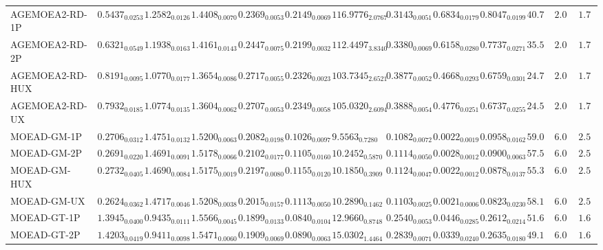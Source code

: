 \documentclass[11pt,a4paper]{article}
\begin{document}
\begin{table}[H]
{\begin{tabular}{lcccccccccccc}
AGEMOEA2-RD-1P & $0.5437_{0.0253}$ & $1.2582_{0.0126}$ & $1.4408_{0.0070}$ & $0.2369_{0.0053}$ & $0.2149_{0.0069}$ & $\mathbf{116.9776}_{2.0767}$ & $0.3143_{0.0051}$ & $0.6834_{0.0179}$ & $0.8047_{0.0199}$ & $40.78$ & $\mathbf{2.00}$ & $1.78$ \\
AGEMOEA2-RD-2P & $0.6321_{0.0549}$ & $1.1938_{0.0163}$ & $1.4161_{0.0143}$ & $0.2447_{0.0075}$ & $0.2199_{0.0032}$ & $\mathbf{112.4497}_{3.8340}$ & $0.3380_{0.0069}$ & $0.6158_{0.0280}$ & $0.7737_{0.0271}$ & $35.56$ & $\mathbf{2.00}$ & $1.78$ \\
AGEMOEA2-RD-HUX & $0.8191_{0.0095}$ & $1.0770_{0.0177}$ & $\mathbf{1.3654}_{0.0086}$ & $\mathbf{0.2717}_{0.0055}$ & $0.2326_{0.0023}$ & $103.7345_{2.6521}$ & $0.3877_{0.0052}$ & $0.4668_{0.0293}$ & $0.6759_{0.0301}$ & $\mathbf{24.78}$ & $\mathbf{2.00}$ & $1.78$ \\
AGEMOEA2-RD-UX & $0.7932_{0.0185}$ & $1.0774_{0.0135}$ & $\mathbf{1.3604}_{0.0062}$ & $0.2707_{0.0053}$ & $0.2349_{0.0058}$ & $105.0320_{2.6094}$ & $0.3888_{0.0054}$ & $0.4776_{0.0251}$ & $0.6737_{0.0255}$ & $\mathbf{24.56}$ & $\mathbf{2.00}$ & $1.78$ \\
MOEAD-GM-1P & $0.2706_{0.0312}$ & $1.4751_{0.0132}$ & $1.5200_{0.0063}$ & $0.2082_{0.0198}$ & $0.1026_{0.0097}$ & $9.5563_{0.7280}$ & $0.1082_{0.0072}$ & $0.0022_{0.0019}$ & $0.0958_{0.0162}$ & $59.00$ & $6.00$ & $2.56$ \\
MOEAD-GM-2P & $0.2691_{0.0220}$ & $1.4691_{0.0091}$ & $1.5178_{0.0066}$ & $0.2102_{0.0177}$ & $0.1105_{0.0160}$ & $10.2452_{0.5870}$ & $0.1114_{0.0050}$ & $0.0028_{0.0012}$ & $0.0900_{0.0063}$ & $57.56$ & $6.00$ & $2.56$ \\
MOEAD-GM-HUX & $0.2732_{0.0405}$ & $1.4690_{0.0084}$ & $1.5175_{0.0019}$ & $0.2197_{0.0080}$ & $0.1155_{0.0120}$ & $10.1850_{0.3909}$ & $0.1124_{0.0047}$ & $0.0022_{0.0012}$ & $0.0878_{0.0137}$ & $55.33$ & $6.00$ & $2.56$ \\
MOEAD-GM-UX & $0.2624_{0.0362}$ & $1.4717_{0.0046}$ & $1.5208_{0.0038}$ & $0.2015_{0.0157}$ & $0.1113_{0.0050}$ & $10.2890_{0.1462}$ & $0.1103_{0.0025}$ & $0.0021_{0.0006}$ & $\mathbf{0.0823}_{0.0230}$ & $58.11$ & $6.00$ & $2.56$ \\
MOEAD-GT-1P & $1.3945_{0.0400}$ & $0.9435_{0.0111}$ & $1.5566_{0.0045}$ & $0.1899_{0.0133}$ & $0.0840_{0.0104}$ & $12.9660_{0.8748}$ & $0.2540_{0.0053}$ & $0.0446_{0.0285}$ & $0.2612_{0.0214}$ & $51.67$ & $6.00$ & $\mathbf{1.67}$ \\
MOEAD-GT-2P & $1.4203_{0.0419}$ & $0.9411_{0.0098}$ & $1.5471_{0.0060}$ & $0.1909_{0.0069}$ & $0.0890_{0.0063}$ & $15.0302_{1.4464}$ & $0.2839_{0.0071}$ & $0.0339_{0.0240}$ & $0.2635_{0.0180}$ & $49.11$ & $6.00$ & $\mathbf{1.67}$ \\

\end{tabular}}
\end{table}
\end{document}
